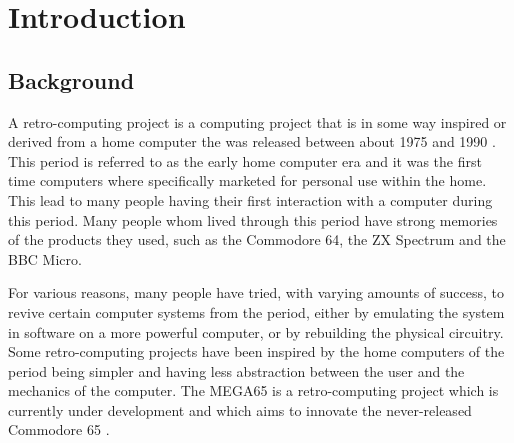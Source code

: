 \chapter{Introduction} %
\label{Chapter1} %

\section{Background}
A retro-computing project is a computing project that is in some way inspired or derived from a home computer the was released between about 1975 and 1990 \cite{magerkurth2004augmenting,suominen2015return}. This period is referred to as the early home computer era and it was the first time computers where specifically marketed for personal use within the home. This lead to many people having their first interaction with a computer during this period. Many people whom lived through this period have strong memories of the products they used, such as the Commodore 64, the ZX Spectrum and the BBC Micro. 

For various reasons, many people have tried, with varying amounts of success, to revive certain computer systems from the period, either by emulating the system in software on a more powerful computer, or by rebuilding the physical circuitry. Some retro-computing projects have been inspired by the home computers of the period being simpler and having less abstraction between the user and the mechanics of the computer. The MEGA65 is a retro-computing project which is currently under development and which aims to innovate the never-released Commodore 65 \cite{mega65}. 

